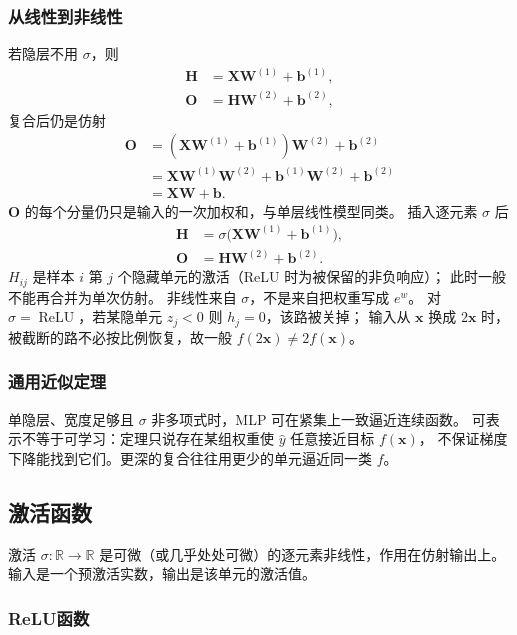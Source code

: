 \subsubsection{从线性到非线性}

若隐层不用 $\sigma$，则
\begin{align*}
\bm{H}&=\bm{X}\bm{W}^{(1)}+\bm{b}^{(1)},\\
\bm{O}&=\bm{H}\bm{W}^{(2)}+\bm{b}^{(2)},
\end{align*}
复合后仍是仿射
\begin{align*}
\bm{O}
&=
(\bm{X}\bm{W}^{(1)}+\bm{b}^{(1)})\bm{W}^{(2)}+\bm{b}^{(2)}\\
&=
\bm{X}\bm{W}^{(1)}\bm{W}^{(2)}+\bm{b}^{(1)}\bm{W}^{(2)}+\bm{b}^{(2)}\\
&=
\bm{X}\bm{W}+\bm{b}.
\end{align*}
$\bm{O}$ 的每个分量仍只是输入的一次加权和，与单层线性模型同类。
插入逐元素 $\sigma$ 后
\begin{align*}
\bm{H}&=\sigma\bigl(\bm{X}\bm{W}^{(1)}+\bm{b}^{(1)}\bigr),\\
\bm{O}&=\bm{H}\bm{W}^{(2)}+\bm{b}^{(2)}.
\end{align*}
$H_{ij}$ 是样本 $i$ 第 $j$ 个隐藏单元的激活（ReLU 时为被保留的非负响应）；
此时一般不能再合并为单次仿射。
非线性来自 $\sigma$，不是来自把权重写成 $e^{w}$。
对 $\sigma=\operatorname{ReLU}$，若某隐单元 $z_j<0$ 则 $h_j=0$，该路被关掉；
输入从 $\bm{x}$ 换成 $2\bm{x}$ 时，被截断的路不必按比例恢复，故一般 $f(2\bm{x})\ne 2f(\bm{x})$。

\subsubsection{通用近似定理}

单隐层、宽度足够且 $\sigma$ 非多项式时，MLP 可在紧集上一致逼近连续函数。
可表示不等于可学习：定理只说存在某组权重使 $\hat{y}$ 任意接近目标 $f(\bm{x})$，
不保证梯度下降能找到它们。更深的复合往往用更少的单元逼近同一类 $f$。

\subsection{激活函数}

激活 $\sigma:\mathbb{R}\to\mathbb{R}$ 是可微（或几乎处处可微）的逐元素非线性，作用在仿射输出上。
输入是一个预激活实数，输出是该单元的激活值。

\subsubsection{ReLU函数}

